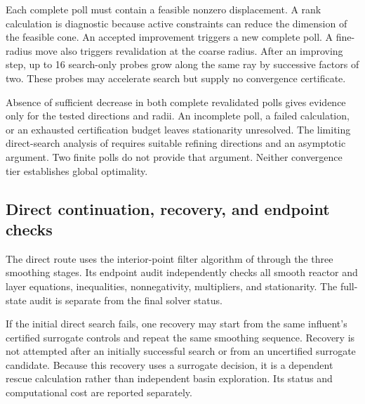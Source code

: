 Each complete poll must contain a feasible nonzero displacement. A rank calculation is diagnostic because active constraints can reduce the dimension of the feasible cone. An accepted improvement triggers a new complete poll. A fine-radius move also triggers revalidation at the coarse radius. After an improving step, up to 16 search-only probes grow along the same ray by successive factors of two. These probes may accelerate search but supply no convergence certificate.

Absence of sufficient decrease in both complete revalidated polls gives evidence only for the tested directions and radii. An incomplete poll, a failed calculation, or an exhausted certification budget leaves stationarity unresolved. The limiting direct-search analysis of \citet{AudetDennis2006} requires suitable refining directions and an asymptotic argument. Two finite polls do not provide that argument. Neither convergence tier establishes global optimality.

\subsection{Direct continuation, recovery, and endpoint checks}

The direct route uses the interior-point filter algorithm of \citet{WachterBiegler2006} through the three smoothing stages. Its endpoint audit independently checks all smooth reactor and layer equations, inequalities, nonnegativity, multipliers, and stationarity. The full-state audit is separate from the final solver status.

If the initial direct search fails, one recovery may start from the same influent's certified surrogate controls and repeat the same smoothing sequence. Recovery is not attempted after an initially successful search or from an uncertified surrogate candidate. Because this recovery uses a surrogate decision, it is a dependent rescue calculation rather than independent basin exploration. Its status and computational cost are reported separately.


